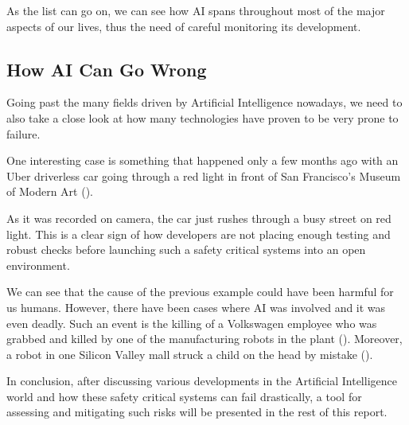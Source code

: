\documentclass[paper=a4, fontsize=11pt]{scrartcl} %
\numberwithin{equation}{section} %
\numberwithin{figure}{section} %
\numberwithin{table}{section} %
\begin{document}
\par
As the list can go on, we can see how AI spans throughout most of the major aspects of our lives, thus the need of careful monitoring its development.


\subsection{How AI Can Go Wrong}

\par
Going past the many fields driven by Artificial Intelligence nowadays, we need to also take a close look at how many technologies have proven to be very prone to failure. \\

\par
One interesting case is something that happened only a few months ago with an Uber driverless car going through a red light in front of San Francisco's Museum of Modern Art (\citet{uber-red-light}).

\par
As it was recorded on camera, the car just rushes through a busy street on red light. This is a clear sign of how developers are not placing enough testing and robust checks before launching such a safety critical systems into an open environment. \\

\par
We can see that the cause of the previous example could have been harmful for us humans. However, there have been cases where AI was involved and it was even deadly. Such an event is the killing of a Volkswagen employee who was grabbed and killed by one of the manufacturing robots in the plant (\citet{volkswagen}). Moreover, a robot in one Silicon Valley mall struck a child on the head by mistake (\citet{knightscope}). \\

\par
In conclusion, after discussing various developments in the Artificial Intelligence world and how these safety critical systems can fail drastically, a tool for assessing and mitigating such risks will be presented in the rest of this report.

\end{document}
